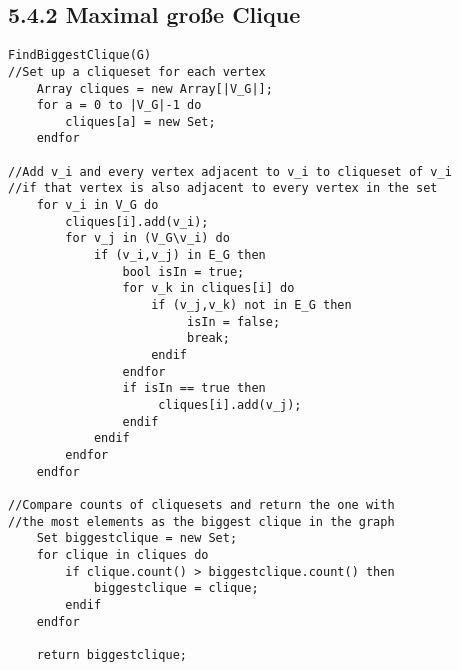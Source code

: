 \subsection*{5.4.2 Maximal große Clique}
\begin{lstlisting}
FindBiggestClique(G)
//Set up a cliqueset for each vertex
    Array cliques = new Array[|V_G|];
    for a = 0 to |V_G|-1 do
        cliques[a] = new Set;
    endfor
    
//Add v_i and every vertex adjacent to v_i to cliqueset of v_i
//if that vertex is also adjacent to every vertex in the set
    for v_i in V_G do
        cliques[i].add(v_i);
        for v_j in (V_G\v_i) do
            if (v_i,v_j) in E_G then
                bool isIn = true;
                for v_k in cliques[i] do
                    if (v_j,v_k) not in E_G then
                	     isIn = false;
                	     break;
                    endif
                endfor
                if isIn == true then
                     cliques[i].add(v_j);
                endif
            endif
        endfor
    endfor
    
//Compare counts of cliquesets and return the one with
//the most elements as the biggest clique in the graph
    Set biggestclique = new Set;
    for clique in cliques do
        if clique.count() > biggestclique.count() then
            biggestclique = clique;
        endif
    endfor
    
    return biggestclique;
\end{lstlisting}
